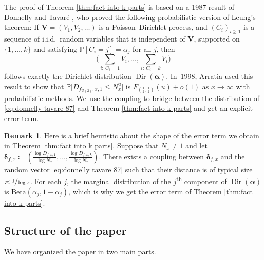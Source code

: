 \documentclass[JEP,XML,SOM,Unicode,published]{cedram}
\newcommand{\bV}{{\boldsymbol V}}
\newcommand{\PP}{\mathbb{P}}
\newcommand{\boldalpha}{\boldsymbol{\alpha}}
\newcommand{\bolddelta}{\boldsymbol{\delta}}
\newcommand{\bg}{\big}
\newcommand{\bgg}{\Big}
\DeclareMathOperator{\Dir}{Dir}
\theoremstyle{plain}
\theoremstyle{definition}
\newtheorem*{rems}{Remark}
\begin{document}
The proof of Theorem \ref{thm:fact into k parts} is based on a 1987 result of Donnelly and Tavaré \cite{DonnellyTavare87}, who proved the following probabilistic version of Leung's theorem: If $\bV = (V_1, V_2, \ldots)$ is a Poisson--Dirichlet process, and $(C_i)_{i \ge 1}$ is a sequence of i.i.d.~random variables that is independent of $\bV$, supported on $\{1, \ldots, k\}$ and satisfying $\PP[C_i = j] = \alpha_j$ for all $j$, then
\begin{equation}
\label{eq:donnelly tavare 87}
\bgg(\sum_{i:\ C_i = 1} V_i, \ldots, \sum_{i:\ C_i = k} V_i\bgg)
\end{equation}
follows exactly the Dirichlet distribution $\Dir(\boldalpha)$. In~1998, Arratia \cite{Arratia98} used this result to show that $\PP\bg[D_{f_{\mathrm U(2)}, x, 1} \le N_x^u\bg]$ is $F_{(\frac{1}{2}, \frac{1}{2})}(u) + o(1)$ as $x \to \infty$ with probabilistic methods. We~use the coupling to bridge between the distribution of \eqref{eq:donnelly tavare 87} and Theorem \ref{thm:fact into k parts} and get an explicit error term.

\begin{rems}
Here is a brief heuristic about the shape of the error term we obtain in Theorem \ref{thm:fact into k parts}. Suppose that $N_x \ne 1$ and let $\bolddelta_{f, x} \coloneqq (\frac{\log D_{f, x, 1}}{\log N_x}, \ldots, \frac{\log D_{f, x, k}}{\log N_x})$. There exists a coupling between $\bolddelta_{f, x}$ and the random vector \eqref{eq:donnelly tavare 87} such that their distance is of typical size $\asymp \sfrac{1}{\log x}$. For each $j$, the marginal distribution of the $j$\textsuperscript{th} component of $\Dir(\boldalpha)$ is $\mathrm{Beta}(\alpha_j, 1-\alpha_j)$, which is why we get the error term of Theorem \ref{thm:fact into k parts}.
\end{rems}

\subsection{Structure of the paper}

We have organized the paper in two main parts.
\end{document}
